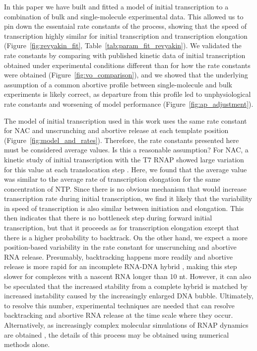 %
In this paper we have built and fitted a model of initial transcription to a
combination of bulk and single-molecule experimental data. This allowed us
to pin down the essentaial rate constants of the process, showing that the
speed of transcription highly similar for initial transcription and
transcription elongation (Figure~\ref{fig:revyakin_fit},
Table~\ref{tab:param_fit_revyakin}). We validated the rate constants by
comparing with published kinetic data of initial transcription obtained under
experimental conditions different than for how the rate constants were
obtained (Figure~\ref{fig:vo_comparison}), and we showed that the underlying
assumption of a common abortive profile between single-molecule and bulk
experiments is likely correct, as departure from this profile led to
unphysiological rate constants and worsening of model performance
(Figure~\ref{fig:ap_adjustment}).

The model of initial transcription used in this work uses the same rate
constant for NAC and unscrunching and abortive release at each template
position (Figure~\ref{fig:model_and_rates}). Therefore, the rate constants
presented here must be considered average values. Is this a reasonable
assumption? For NAC, a kinetic study of initial transcription with the T7 RNAP
showed large variation for this value at each translocation step
\cite{tang_real-time_2009}. Here, we found that the average value was similar
to the average rate of transcription elongation for the same concentration of
NTP. Since there is no obvious mechanism that would increase transcription
rate during initial transcription, we find it likely that the variability in
speed of transcription is also similar between initiation and elongation. This
then indicates that there is no bottleneck step during forward initial
transcription, but that it proceeds as for transcription elongation except
that there is a higher probability to backtrack. On the other hand, we expect
a more position-based variability in the rate constant for unscrunching and
abortive RNA release. Presumably, backtracking happens more readily and
abortive release is more rapid for an incomplete RNA-DNA hybrid
\cite{nudler_rnadna_1997,komissarova_shortening_2002}, making this step slower
for complexes with a nascent RNA longer than 10 nt. However, it can also be
speculated that the increased stability from a complete hybrid is matched by
increased instability caused by the increasingly enlarged DNA bubble.
Ultimately, to resolve this number, experimental techniques are needed that
can resolve backtracking and abortive RNA release at the time scale where they
occur. Alternatively, as increasingly complex molecular simulations of RNAP
dynamics are obtained \cite{silva_millisecond_2014}, the details of this
process may be obtained using numerical methods alone.

